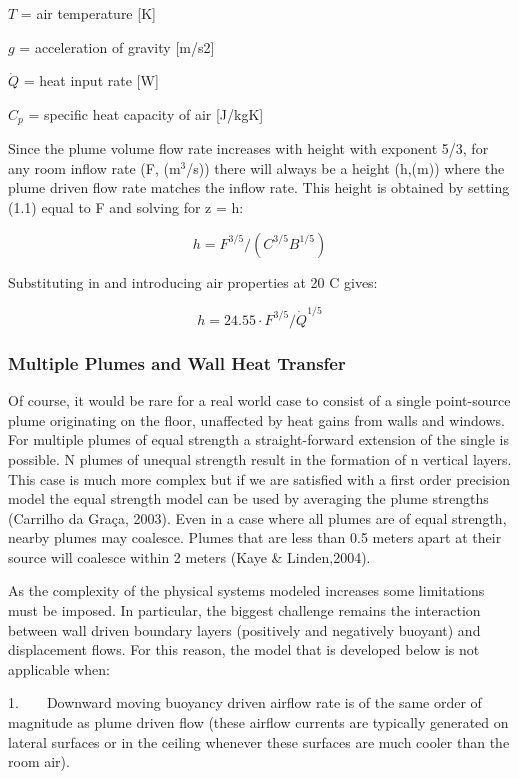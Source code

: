 \(T\) = air temperature {[}K{]}

\(g\) = acceleration of gravity {[}m/s2{]}

\(\dot Q\) = heat input rate {[}W{]}

\({C_p}\) = specific heat capacity of air {[}J/kgK{]}

Since the plume volume flow rate increases with height with exponent 5/3, for any room inflow rate (F, (m\(^{3}\)/s)) there will always be a height (h,(m)) where the plume driven flow rate matches the inflow rate. This height is obtained by setting (1.1) equal to F and solving for z = h:

\begin{equation}
h = {F^{3/5}}/({C^{3/5}}{B^{1/5}})
\end{equation}

Substituting in and introducing air properties at 20 C gives:

\begin{equation}
h = 24.55\cdot {F^{3/5}}/{\dot Q^{1/5}}
\end{equation}

\subsubsection{Multiple Plumes and Wall Heat Transfer}\label{multiple-plumes-and-wall-heat-transfer}

Of course, it would be rare for a real world case to consist of a single point-source plume originating on the floor, unaffected by heat gains from walls and windows. For multiple plumes of equal strength a straight-forward extension of the single is possible. N plumes of unequal strength result in the formation of n vertical layers. This case is much more complex but if we are satisfied with a first order precision model the equal strength model can be used by averaging the plume strengths (Carrilho da Graça, 2003). Even in a case where all plumes are of equal strength, nearby plumes may coalesce. Plumes that are less than 0.5 meters apart at their source will coalesce within 2 meters (Kaye \& Linden,2004).

As the complexity of the physical systems modeled increases some limitations must be imposed. In particular, the biggest challenge remains the interaction between wall driven boundary layers (positively and negatively buoyant) and displacement flows. For this reason, the model that is developed below is not applicable when:

1.~~~~Downward moving buoyancy driven airflow rate is of the same order of magnitude as plume driven flow (these airflow currents are typically generated on lateral surfaces or in the ceiling whenever these surfaces are much cooler than the room air).

